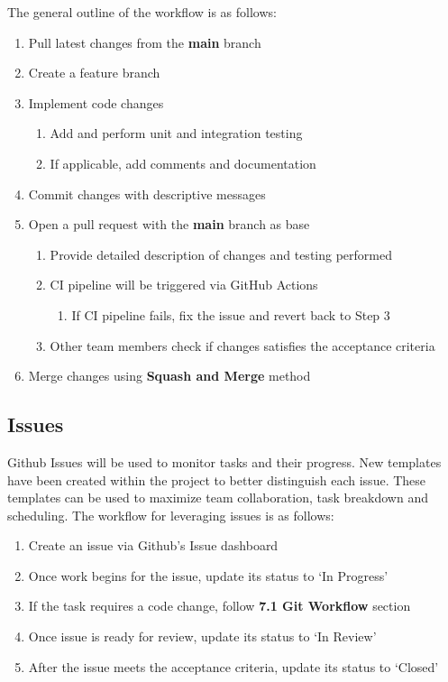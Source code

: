 \documentclass{article}
\begin{document}
\vspace{10pt}

\noindent The general outline of the workflow is as follows:

\begin{enumerate}
  \item Pull latest changes from the \textbf{main} branch
  \item Create a feature branch
  \item Implement code changes
  \begin{enumerate}
    \item Add and perform unit and integration testing
    \item If applicable, add comments and documentation
  \end{enumerate}
  \item Commit changes with descriptive messages
  \item Open a pull request with the \textbf{main} branch as base
  \begin{enumerate}
    \item Provide detailed description of changes and testing performed
    \item CI pipeline will be triggered via GitHub Actions
    \begin{enumerate}
      \item  If CI pipeline fails, fix the issue and revert back to Step 3
    \end{enumerate}
    \item Other team members check if changes satisfies the acceptance criteria
  \end{enumerate}
  \item Merge changes using \textbf{Squash and Merge} method
\end{enumerate}


\subsection{Issues}
Github Issues will be used to monitor tasks and their progress. New templates have been created within the project to better distinguish each issue. These templates can be used to maximize team collaboration, task breakdown and scheduling. The workflow for leveraging issues is as follows:

\begin{enumerate}
  \item Create an issue via Github's Issue dashboard
  \item Once work begins for the issue, update its status to `In Progress'
  \item If the task requires a code change, follow \textbf{7.1 Git Workflow} section
  \item Once issue is ready for review, update its status to `In Review'
  \item After the issue meets the acceptance criteria, update its status to `Closed'
\end{enumerate}
\end{document}
